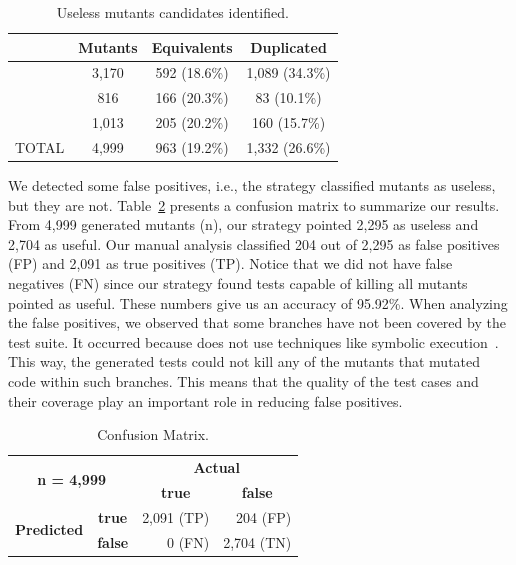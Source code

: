 \scriptsize
\begin{table}[ht]
	\centering
	\caption{Useless mutants candidates identified.}
	\label{tab:number-mutants}
	\begin{tabular}{|l|c|c|c|}
		\hline
		& \textbf{Mutants} & \textbf{Equivalents}  & \textbf{Duplicated}    \\ \hline
		\mujava{} & 3,170    & 592 (18.6\%) & 1,089 (34.3\%) \\ \hline
		\major{}  & 816     & 166 (20.3\%) & 83 (10.1\%)   \\ \hline
		\pit{}    & 1,013    & 205 (20.2\%) & 160 (15.7\%)  \\ \hline
		TOTAL  & 4,999    & 963 (19.2\%) & 1,332 (26.6\%)  \\ \hline
	\end{tabular}
\end{table}
\normalsize

We detected some false positives, i.e., the strategy classified mutants as useless, but they are not. 
Table~\ref{tab:confusion-table} presents a confusion matrix to summarize our results. 
From 4,999 generated mutants (n), our strategy pointed 2,295 as useless and 2,704 as useful. 
Our manual analysis classified 204 out of 2,295 as false positives (FP) and 2,091 as true positives (TP). 
Notice that we did not have false negatives (FN) since our strategy found tests capable of killing all mutants pointed as useful. 
These numbers give us an accuracy of 95.92\%. 
When analyzing the false positives, we observed that some branches have not been covered by the test suite. 
It occurred because \randoop{} does not use techniques like symbolic execution~\cite{CORINA:2010:1}. 
This way, the generated tests could not kill any of the mutants that mutated code within such branches. 
This means that the quality of the test cases and their coverage play an important role in reducing false positives.

\scriptsize
\begin{table}[ht]
	\centering
	\caption{Confusion Matrix.}
	\label{tab:confusion-table}
	\begin{tabular}{|c|c|c|r|}
		\hline
		\multicolumn{2}{|c|}{\multirow{2}{*}{\textbf{n = 4,999}}} & \multicolumn{2}{c|}{\textbf{Actual}}                                 \\ \cline{3-4} 
		\multicolumn{2}{|c|}{}                                   & \textbf{true}                  & \multicolumn{1}{c|}{\textbf{false}} \\ \hline
		\multirow{2}{*}{\textbf{Predicted}}   & \textbf{true}    & \multicolumn{1}{r|}{2,091 (TP)} & 204 (FP)                            \\ \cline{2-4} 
		& \textbf{false}   & \multicolumn{1}{r|}{0 (FN)}    & 2,704 (TN)                           \\ \hline
	\end{tabular}
\end{table}
\normalsize

